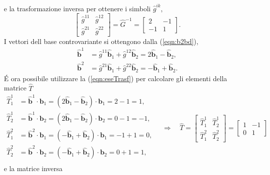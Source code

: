  e la trasformazione inversa per ottenere i simboli $\hat{g}^{ik}$,
\begin{equation}
 \begin{bmatrix} \hat{g}^{11} & \hat{g}^{12} \\
                 \hat{g}^{21} & \hat{g}^{22} \end{bmatrix} = \hat{G}^{-1} =
 \begin{bmatrix} 2 & -1 \\ -1 & 1 \end{bmatrix} .
\end{equation}
I vettori dell base controvariante si ottengono dalla (\ref{eqn:b2bd}),
\begin{equation}
\begin{aligned}
 \bm{\hat{b}}^1 & = \hat{g}^{11} \bm{\hat{b}}_1 + \hat{g}^{12} \bm{\hat{b}}_2 = 
      2 \bm{\hat{b}}_1 - \bm{\hat{b}}_2  , \\
 \bm{\hat{b}}^2 & = \hat{g}^{21} \bm{\hat{b}}_1 + \hat{g}^{22} \bm{\hat{b}}_2 =
     - \bm{\hat{b}}_1 + \bm{\hat{b}}_2 .
\end{aligned}
\end{equation}
\'E ora possibile utilizzare la (\ref{eqn:eseTrasf}) per calcolare gli elementi della matrice $\hat{T}$
\begin{equation}
\begin{aligned}
 \hat{T}^{1}_{1} &= \bm{\hat{b}}^1 \cdot \bm{b}_1 = 
  (2 \bm{\hat{b}}_1 - \bm{\hat{b}}_2) \cdot \bm{b}_1 = 
   2 - 1 = 1 ,  \\
 \hat{T}^{1}_{2} &= \bm{\hat{b}}^1 \cdot \bm{b}_2 = 
  (2 \bm{\hat{b}}_1 - \bm{\hat{b}}_2) \cdot \bm{b}_2 = 
   0 - 1 = -1 ,  \\
 \hat{T}^{2}_{1} &= \bm{\hat{b}}^2 \cdot \bm{b}_1 = 
  (- \bm{\hat{b}}_1 + \bm{\hat{b}}_2) \cdot \bm{b}_1 = 
   -1 + 1 = 0 ,  \\
 \hat{T}^{2}_{2} &= \bm{\hat{b}}^2 \cdot \bm{b}_2 = 
  (- \bm{\hat{b}}_1 + \bm{\hat{b}}_2) \cdot \bm{b}_2 = 
    0 + 1 = 1 ,  \\
\end{aligned}
 \quad \Rightarrow \quad
 \hat{T} = \begin{bmatrix} \hat{T}^1_1 & \hat{T}^1_2 \\ \hat{T}^2_1 & \hat{T}^2_2 \end{bmatrix}
   = \begin{bmatrix} 1 & -1 \\ 0 & 1 \end{bmatrix}
\end{equation}
 e la matrice inversa
